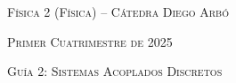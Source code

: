 \documentclass[11pt,spanish]{article}
\begin{document}
    \begin{center}
    \textsc{\large Física 2 (Física) -- Cátedra Diego Arbó}
    \par\end{center}{\large \par}
    
    \begin{center}
    \textsc{\large Primer Cuatrimestre de 2025}
    \par\end{center}{\large \par}
    
    \begin{center}
    \textsc{\large Guía 2: Sistemas Acoplados Discretos}
    \par\end{center}{\large \par}
\end{document}
